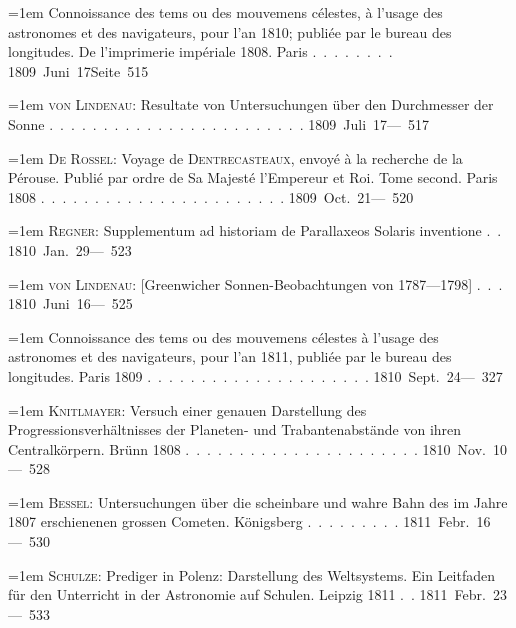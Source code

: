 \clearpage
{}
\begingroup
\raggedright
\noindent\hangindent=1em Connoissance des tems ou des mouvemens célestes, à l'usage des astronomes et des navigateurs, pour l'an 1810; publiée par le bureau des longitudes. De l'imprimerie impériale 1808. Paris \mbox{.\ .\ .\ .\ .\ .\ .\ .} \hfill\mbox{1809 Juni 17}\quad\mbox{Seite 515}\par\smallskip
\noindent\hangindent=1em \textsc{von Lindenau}: Resultate von Untersuchungen über den Durchmesser der Sonne \mbox{.\ .\ .\ .\ .\ .\ .\ .\ .\ .\ .\ .\ .\ .\ .\ .\ .\ .\ .\ .\ .\ .\ .\ .} \hfill\mbox{1809 Juli 17}\quad\mbox{--- 517}\par\smallskip
\noindent\hangindent=1em \textsc{De Rossel}: Voyage de \textsc{Dentrecasteaux}, envoyé à la recherche de la Pérouse. Publié par ordre de Sa Majesté l'Empereur et Roi. Tome second. Paris 1808 \mbox{.\ .\ .\ .\ .\ .\ .\ .\ .\ .\ .\ .\ .\ .\ .\ .\ .\ .\ .\ .\ .\ .\ .} \hfill\mbox{1809 Oct. 21}\quad\mbox{--- 520}\par\smallskip
\noindent\hangindent=1em \textsc{Regner}: Supplementum ad historiam de Parallaxeos Solaris inventione \mbox{.\ .} \hfill\mbox{1810 Jan. 29}\quad\mbox{--- 523}\par\smallskip
\noindent\hangindent=1em \textsc{von Lindenau}: [Greenwicher Sonnen-Beobachtungen von 1787---1798] \mbox{.\ .\ .} \hfill\mbox{1810 Juni 16}\quad\mbox{--- 525}\par\smallskip
\noindent\hangindent=1em Connoissance des tems ou des mouvemens célestes à l'usage des astronomes et des navigateurs, pour l'an 1811, publiée par le bureau des longitudes. Paris 1809 \mbox{.\ .\ .\ .\ .\ .\ .\ .\ .\ .\ .\ .\ .\ .\ .\ .\ .\ .\ .\ .\ .} \hfill\mbox{1810 Sept. 24}\quad\mbox{--- 327}\par\smallskip
\noindent\hangindent=1em \textsc{Knitlmayer}: Versuch einer genauen Darstellung des Progressionsverhältnisses der Planeten- und Trabantenabstände von ihren Centralkörpern. Brünn 1808 \mbox{.\ .\ .\ .\ .\ .\ .\ .\ .\ .\ .\ .\ .\ .\ .\ .\ .\ .\ .\ .\ .\ .} \hfill\mbox{1810 Nov. 10}\quad\mbox{--- 528}\par\smallskip
\noindent\hangindent=1em \textsc{Bessel}: Untersuchungen über die scheinbare und wahre Bahn des im Jahre 1807 erschienenen grossen Cometen. Königsberg \mbox{.\ .\ .\ .\ .\ .\ .\ .\ .} \hfill\mbox{1811 Febr. 16}\quad\mbox{--- 530}\par\smallskip
\noindent\hangindent=1em \textsc{Schulze}: Prediger in Polenz: Darstellung des Weltsystems. Ein Leitfaden für den Unterricht in der Astronomie auf Schulen. Leipzig 1811 \mbox{.\ .} \hfill\mbox{1811 Febr. 23}\quad\mbox{--- 533}\par\smallskip

